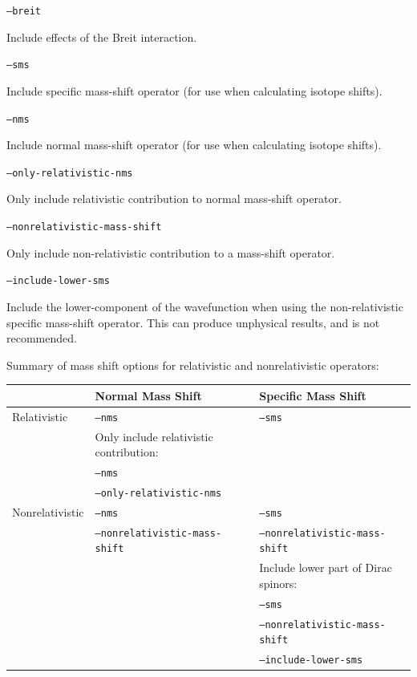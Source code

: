 \documentclass{report}
\begin{document}
\texttt{--breit} 
\begin{adjustwidth}{1cm}{}
Include effects of the Breit interaction.
\end{adjustwidth}
\texttt{--sms} 
\begin{adjustwidth}{1cm}{}
Include specific mass-shift operator (for use when calculating isotope shifts).
\end{adjustwidth}
\texttt{--nms} 
\begin{adjustwidth}{1cm}{}
Include normal mass-shift operator (for use when calculating isotope shifts).
\end{adjustwidth}
\texttt{--only-relativistic-nms} 
\begin{adjustwidth}{1cm}{}
Only include relativistic contribution to normal mass-shift operator.
\end{adjustwidth}
\texttt{--nonrelativistic-mass-shift}
\begin{adjustwidth}{1cm}{}
Only include non-relativistic contribution to a mass-shift operator.
\end{adjustwidth}

\texttt{--include-lower-sms}
\begin{adjustwidth}{1cm}{}
Include the lower-component of the wavefunction when using the non-relativistic specific mass-shift operator.
This can produce unphysical results, and is not recommended.
\end{adjustwidth}

Summary of mass shift options for relativistic and nonrelativistic operators:
\begin{adjustwidth}{1cm}{}
\begin{tabular}{|l|l|l|}
\cline{2-3}
\multicolumn{1}{c|}{} & Normal Mass Shift & Specific Mass Shift \\
\hline
Relativistic & \texttt{--nms} & \texttt{--sms} \\
\cline{2-2}
 & Only include relativistic contribution: & \\
 & \texttt{--nms} & \\
 & \texttt{--only-relativistic-nms} & \\
\hline
Nonrelativistic & \texttt{--nms} & \texttt{--sms} \\
 & \texttt{--nonrelativistic-mass-shift} & \texttt{--nonrelativistic-mass-shift} \\
\cline{3-3}
 & & Include lower part of Dirac spinors: \\
 & & \texttt{--sms} \\
 & & \texttt{--nonrelativistic-mass-shift} \\
 & & \texttt{--include-lower-sms} \\
\hline
\end{tabular}
\end{adjustwidth}
\end{document}
